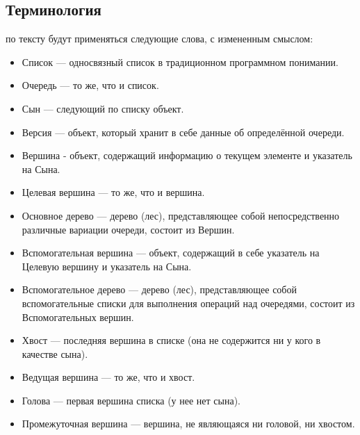 \documentclass[a4paper,12pt]{extarticle}
\begin{document}
\subsection{Терминология}
 по тексту будут применяться следующие слова, с измененным смыслом:
\begin{itemize}
    \item Список — односвязный список в традиционном программном понимании.
    \item Очередь — то же, что и список.
    \item Сын — следующий по списку объект.
    \item Версия — объект, который хранит в себе данные об определённой очереди.
    \item Вершина - объект, содержащий информацию о текущем элементе и указатель на Сына.
    \item Целевая вершина — то же, что и вершина.
    \item Основное дерево — дерево (лес), представляющее собой непосредственно различные вариации очереди, состоит из Вершин.
    \item Вспомогательная вершина — объект, содержащий в себе указатель на Целевую вершину и указатель на Сына.
    \item Вспомогательное дерево — дерево (лес), представляющее собой вспомогательные списки для выполнения операций над очередями, состоит из Вспомогательных вершин.
    \item Хвост — последняя вершина в списке (она не содержится ни у кого в качестве сына).
    \item Ведущая вершина — то же, что и хвост.
    \item Голова — первая вершина списка (у нее нет сына).
    \item Промежуточная вершина — вершина, не являющаяся ни головой, ни хвостом.
\end{itemize}
\end{document}
